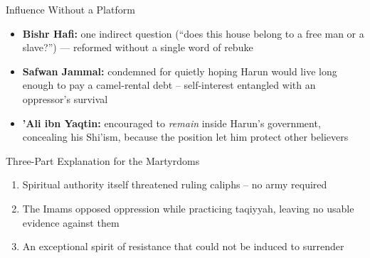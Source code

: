 \begin{frame}{Influence Without a Platform}
\begin{itemize}[itemsep=5pt]
  \item \textbf{Bishr Hafi:} one indirect question (``does this house belong to a free man or a slave?'') --- reformed without a single word of rebuke
  \item \textbf{Safwan Jammal:} condemned for quietly hoping Harun would live long enough to pay a camel-rental debt -- self-interest entangled with an oppressor's survival
  \item \textbf{'Ali ibn Yaqtin:} encouraged to \emph{remain} inside Harun's government, concealing his Shi'ism, because the position let him protect other believers
\end{itemize}
\end{frame}

\begin{frame}{Three-Part Explanation for the Martyrdoms}
\begin{enumerate}[label=\arabic*.,itemsep=6pt]
  \item Spiritual authority itself threatened ruling caliphs -- no army required
  \item The Imams opposed oppression while practicing taqiyyah, leaving no usable evidence against them
  \item An exceptional spirit of resistance that could not be induced to surrender
\end{enumerate}
\end{frame}

